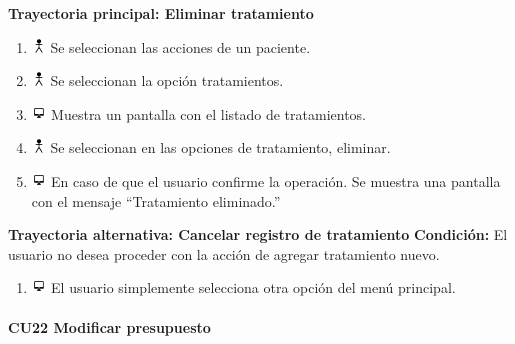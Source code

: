 \textbf{Trayectoria principal: Eliminar tratamiento}  
\begin{enumerate}
\item \includegraphics[height=1em]{pictures/actor.png} Se seleccionan las acciones de un paciente.
\item \includegraphics[height=1em]{pictures/actor.png} Se seleccionan la opción tratamientos.
\item \includegraphics[height=1em]{pictures/sistema.png} Muestra un pantalla con el listado de tratamientos.
\item \includegraphics[height=1em]{pictures/actor.png} Se seleccionan en las opciones de tratamiento, eliminar.
\item \includegraphics[height=1em]{pictures/sistema.png} En caso de que el usuario confirme la operación. Se muestra una pantalla con el mensaje ``Tratamiento eliminado.''
\end{enumerate} \bigskip


\textbf{Trayectoria alternativa: Cancelar registro de tratamiento} 
\vspace{0.3em}
\textbf{Condición:} El usuario no desea proceder con la acción de agregar tratamiento nuevo.
\begin{enumerate}
\item \includegraphics[height=1em]{pictures/sistema.png} El usuario simplemente selecciona otra opción del menú principal.
\end{enumerate} \bigskip


\paragraph{CU22 Modificar presupuesto}

